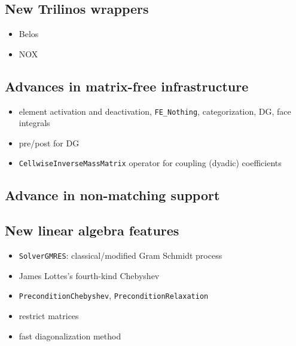\documentclass{ansarticle-preprint}
\begin{document}
\subsection{New Trilinos wrappers}\label{sec:trilinos}

\begin{itemize}
\item Belos
\item NOX
\end{itemize}


\subsection{Advances in matrix-free infrastructure}\label{sec:mf}

\begin{itemize}
\item element activation and deactivation, \texttt{FE\_Nothing}, categorization, DG, face integrals 
\item pre/post for DG
\item \texttt{CellwiseInverseMassMatrix} operator for coupling (dyadic) coefficients
\end{itemize}

\subsection{Advance in non-matching support}\label{sec:nonmatching}






\subsection{New linear algebra features}\label{sec:lac}



\begin{itemize}
  \item \texttt{SolverGMRES}: classical/modified Gram Schmidt process
  \item James Lottes’s fourth-kind Chebyshev
  \item \texttt{PreconditionChebyshev}, \texttt{PreconditionRelaxation}
  \item restrict matrices
  \item fast diagonalization method
\end{itemize}
\end{document}
